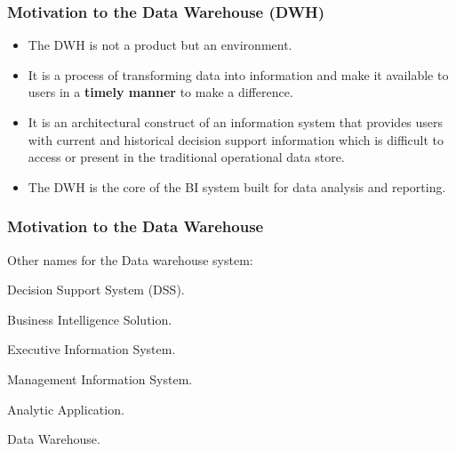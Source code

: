 
\begin{frame}
\frametitle{Motivation to the Data Warehouse (DWH)}

\begin{itemize}[<+->]
	\item The DWH is not a product but an environment.
	\item It is a process of transforming data into information and make it available to users in a \textbf{timely manner} to make a difference.
	\item It is an architectural construct of an information system that provides users with current and historical decision support information which is difficult to access or present in the traditional operational data store.
	\item The DWH is the core of the BI system built for data analysis and reporting.
\end{itemize}

\end{frame}


\begin{frame}
\frametitle{Motivation to the Data Warehouse}

Other names for the Data warehouse system:

\begin{wideitemize}
\item Decision Support System (DSS).
\item Business Intelligence Solution.
\item Executive Information System.
\item Management Information System.
\item Analytic Application.
\item Data Warehouse.

\end{wideitemize}


\end{frame}

\VideoClassification[column=2]
